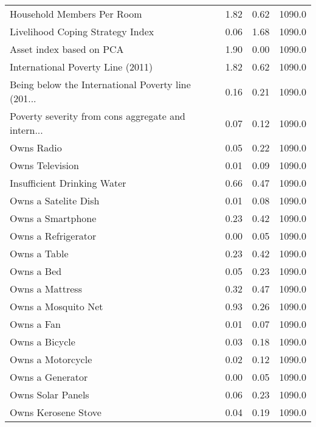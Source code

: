 \begin{longtable}{lrrr}
Household Members Per Room                         &  1.82 &  0.62 &  1090.0 \\
Livelihood Coping Strategy Index                   &  0.06 &  1.68 &  1090.0 \\
Asset index based on PCA                           &  1.90 &  0.00 &  1090.0 \\
International Poverty Line (2011)                  &  1.82 &  0.62 &  1090.0 \\
Being below the International Poverty line (201... &  0.16 &  0.21 &  1090.0 \\
Poverty severity from cons aggregate and intern... &  0.07 &  0.12 &  1090.0 \\
Owns Radio                                         &  0.05 &  0.22 &  1090.0 \\
Owns Television                                    &  0.01 &  0.09 &  1090.0 \\
Insufficient Drinking Water                        &  0.66 &  0.47 &  1090.0 \\
Owns a Satelite Dish                               &  0.01 &  0.08 &  1090.0 \\
Owns a Smartphone                                  &  0.23 &  0.42 &  1090.0 \\
Owns a Refrigerator                                &  0.00 &  0.05 &  1090.0 \\
Owns a Table                                       &  0.23 &  0.42 &  1090.0 \\
Owns a Bed                                         &  0.05 &  0.23 &  1090.0 \\
Owns a Mattress                                    &  0.32 &  0.47 &  1090.0 \\
Owns a Mosquito Net                                &  0.93 &  0.26 &  1090.0 \\
Owns a Fan                                         &  0.01 &  0.07 &  1090.0 \\
Owns a Bicycle                                     &  0.03 &  0.18 &  1090.0 \\
Owns a Motorcycle                                  &  0.02 &  0.12 &  1090.0 \\
Owns a Generator                                   &  0.00 &  0.05 &  1090.0 \\
Owns Solar Panels                                  &  0.06 &  0.23 &  1090.0 \\
Owns Kerosene Stove                                &  0.04 &  0.19 &  1090.0 \\

\end{longtable}
